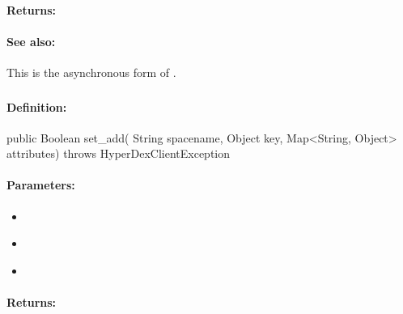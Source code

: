 \paragraph{Returns:}


\paragraph{See also:}  This is the asynchronous form of .

\pagebreak
\subsubsection{}
\label{api:java:set_add}


\paragraph{Definition:}
\begin{javacode}
public Boolean set_add(
        String spacename,
        Object key,
        Map<String, Object> attributes) throws HyperDexClientException
\end{javacode}

\paragraph{Parameters:}
\begin{itemize}[noitemsep]
\item {}\\

\item {}\\

\item {}\\

\end{itemize}

\paragraph{Returns:}


